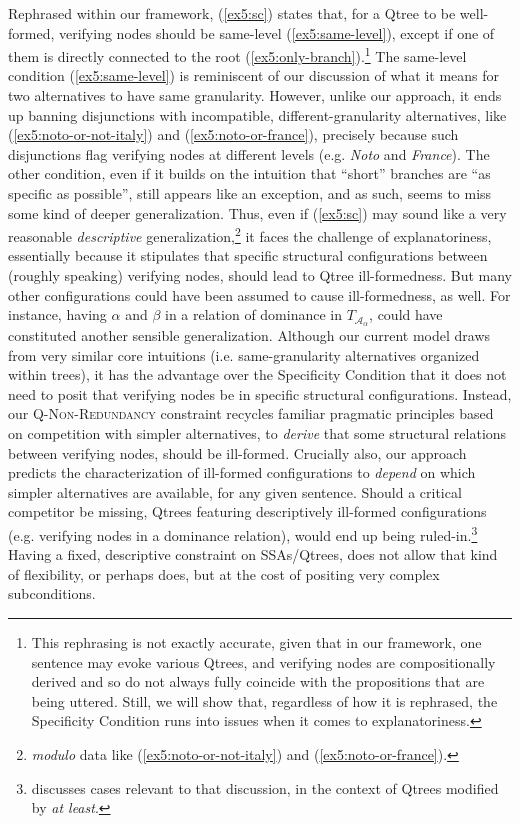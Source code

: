 Rephrased within our framework, (\ref{ex5:sc}) states that, for a Qtree to be well-formed, verifying nodes should be same-level (\ref{ex5:same-level}), except if one of them is directly connected to the root (\ref{ex5:only-branch}).\footnote{This rephrasing is not exactly accurate, given that in our framework, one sentence may evoke various Qtrees, and verifying nodes are compositionally derived and so do not always fully coincide with the propositions that are being uttered. Still, we will show that, regardless of how it is rephrased, the Specificity Condition runs into issues when it comes to explanatoriness.} The same-level condition (\ref{ex5:same-level}) is reminiscent of our discussion of what it means for two alternatives to have same granularity. However, unlike our approach, it ends up banning disjunctions with incompatible, different-granularity alternatives, like (\ref{ex5:noto-or-not-italy}) and (\ref{ex5:noto-or-france}), precisely because such disjunctions flag verifying nodes at different levels (e.g. \textit{Noto} and \textit{France}). The other condition, even if it builds on the intuition that ``short'' branches are ``as specific as possible'', still appears like an exception, and as such, seems to miss some kind of deeper generalization. Thus, even if (\ref{ex5:sc}) may sound like a very reasonable \textit{descriptive} generalization,\footnote{\textit{modulo} data like (\ref{ex5:noto-or-not-italy}) and (\ref{ex5:noto-or-france}).} it faces the challenge of explanatoriness, essentially because it stipulates that specific structural configurations between (roughly speaking) verifying nodes, should lead to Qtree ill-formedness. But many other configurations could have been assumed to cause ill-formedness, as well. For instance, having $\alpha$ and $\beta$ in a relation of dominance in $T_{\mathcal{A}_{\alpha}}$, could have constituted another sensible generalization. Although our current model draws from very similar core intuitions (i.e. same-granularity alternatives organized within trees), it has the advantage over the Specificity Condition that it does not need to posit that verifying nodes be in specific structural configurations. Instead, our \textsc{Q-Non-Redundancy} constraint recycles familiar pragmatic principles based on competition with simpler alternatives, to \textit{derive} that some structural relations between verifying nodes, should be ill-formed. Crucially also, our approach predicts the characterization of ill-formed configurations to \textit{depend} on which simpler alternatives are available, for any given sentence. Should a critical competitor be missing, Qtrees featuring descriptively ill-formed configurations (e.g. verifying nodes in a dominance relation), would end up being ruled-in.\footnote{\textcite{HenotMortier2025a} discusses cases relevant to that discussion, in the context of Qtrees modified by \textit{at least}.} Having a fixed, descriptive constraint on SSAs/Qtrees, does not allow that kind of flexibility, or perhaps does, but at the cost of positing very complex subconditions.\\


